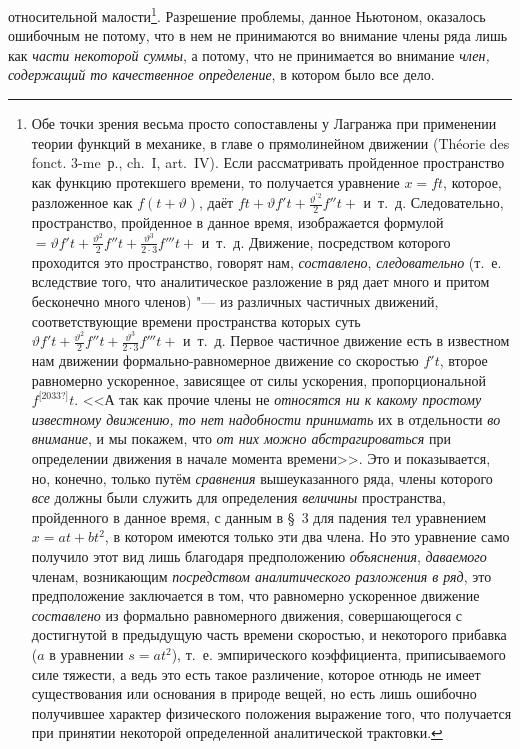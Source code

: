 относительной малости\footnote{
Обе точки зрения весьма просто
сопоставлены у Лагранжа при
применении теории функций в механике, в главе о прямолинейном движении
(Théorie des fonct. 3-me~р., ch.~I, art.~IV). Если
рассматривать пройденное пространство как функцию протекшего времени, то
получается уравнение $x=ft$, которое, разложенное
как $f(t+\vartheta )$, даёт
$ft + \vartheta f't + \frac{\vartheta ^{'2}} 2 f''t + $
и~т.~д. Следовательно, пространство, пройденное в данное время,
изображается формулой
$ = \vartheta f't+\frac{\vartheta ^2}
2 f''t + \frac{\vartheta ^3}{2 \cdot 3} f'''t + $
и~т.~д. Движение, посредством которого проходится это
пространство, говорят нам, {\em составлено}, {\em следовательно} (т.~е.
вследствие того, что аналитическое разложение в ряд дает много и притом
бесконечно много членов) "--- из различных частичных движений,
соответствующие времени пространства которых суть
$ \vartheta f't+\frac{\vartheta ^2}
2 f''t + \frac{\vartheta ^3}{2 \cdot 3} f'''t + $
и~т.~д. Первое частичное
движение есть в известном нам движении формально-равномерное движение со
скоростью $f't$, второе равномерно ускоренное, зависящее
от силы ускорения, пропорциональной $f^{\text{[2033?]}}t$.
<<А так как прочие члены не {\em относятся ни к какому простому
известному движению, то нет надобности принимать} их в
отдельности {\em во внимание}, и мы покажем, что
{\em от них можно абстрагироваться} при определении движения в
начале момента времени>>. Это и показывается, но, конечно, только путём
{\em сравнения} вышеуказанного ряда, члены которого {\em все} должны были
служить для определения {\em величины}
пространства, пройденного в данное время, с данным в §~3 для
падения тел уравнением $x=at+bt^2$, в
котором имеются только эти два члена. Но это уравнение само получило этот
вид лишь благодаря предположению {\em объяснения}, {\em даваемого} членам,
возникающим {\em посредством аналитического разложения в ряд},
это предположение заключается в том, что равномерно ускоренное движение
{\em составлено} из формально равномерного движения, совершающегося
с достигнутой в предыдущую часть времени скоростью, и некоторого прибавка
($a$ в уравнении $s=at^2$), т.~е. эмпирического коэффициента,
приписываемого силе тяжести, а ведь это есть такое различение, которое
отнюдь не имеет существования или основания в природе вещей, но есть лишь
ошибочно получившее характер физического положения выражение того, что
получается при принятии некоторой определенной аналитической трактовки.}.
Разрешение проблемы, данное Ньютоном, оказалось ошибочным не потому, что в
нем не принимаются во внимание члены ряда лишь как
{\em части некоторой суммы}, а потому, что не
принимается во внимание {\em член, содержащий то
качественное определение}, в котором было все дело.

